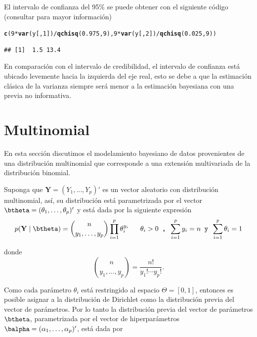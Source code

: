 \documentclass[10pt,openright]{book}\usepackage[]{graphicx}\usepackage[]{color}
\makeatletter
\newcommand{\hlnum}[1]{\textcolor[rgb]{0.686,0.059,0.569}{#1}}%
\newcommand{\hlopt}[1]{\textcolor[rgb]{0,0,0}{#1}}%
\newcommand{\hlstd}[1]{\textcolor[rgb]{0.345,0.345,0.345}{#1}}%
\newcommand{\hlkwd}[1]{\textcolor[rgb]{0.737,0.353,0.396}{\textbf{#1}}}%
\newenvironment{kframe}{%
 \def\at@end@of@kframe{}%
 \ifinner\ifhmode%
  \def\at@end@of@kframe{\end{minipage}}%
  \begin{minipage}{\columnwidth}%
 \fi\fi%
 \def\FrameCommand##1{\hskip\@totalleftmargin \hskip-\fboxsep
 \colorbox{shadecolor}{##1}\hskip-\fboxsep
     \hskip-\linewidth \hskip-\@totalleftmargin \hskip\columnwidth}%
 \MakeFramed {\advance\hsize-\width
   \@totalleftmargin\z@ \linewidth\hsize
   \@setminipage}}%
 {\par\unskip\endMakeFramed%
 \at@end@of@kframe}
\newenvironment{knitrout}{}{} %
\makeatother
\begin{document}
\begin{Eje}
El intervalo de confianza del 95\% se puede obtener con el siguiente c\'odigo (consultar  para mayor informaci\'on)
\begin{knitrout}
\color{fgcolor}\begin{kframe}
\begin{alltt}
\hlkwd{c}\hlstd{(}\hlnum{9} \hlopt{*} \hlkwd{var}\hlstd{(y[,}\hlnum{1}\hlstd{])} \hlopt{/} \hlkwd{qchisq}\hlstd{(}\hlnum{0.975}\hlstd{,}\hlnum{9}\hlstd{),} \hlnum{9} \hlopt{*} \hlkwd{var}\hlstd{(y[,}\hlnum{2}\hlstd{])} \hlopt{/} \hlkwd{qchisq}\hlstd{(}\hlnum{0.025}\hlstd{,}\hlnum{9}\hlstd{))}
\end{alltt}
\begin{verbatim}
## [1]  1.5 13.4
\end{verbatim}
\end{kframe}
\end{knitrout}
En comparaci\'on con el intervalo de credibilidad, el intervalo de confianza est\'a ubicado levemente hacia la izquierda del eje real, esto se debe a que la estimaci\'on cl\'asica de la varianza siempre ser\'a menor a la estimaci\'on bayesiana con una previa no informativa.
\end{Eje}
  
\section{Multinomial}
En esta secci\'on discutimos el modelamiento bayesiano de datos provenientes de una distribuci\'on multinomial que corresponde a una extensi\'on multivariada de la distribuci\'on binomial. 

Suponga que $\textbf{Y}=(Y_1,\ldots,Y_p)'$ es un vector aleatorio con distribuci\'on multinomial, as\'i, su distribuci\'on est\'a parametrizada por el vector $\btheta=(\theta_1,\ldots,\theta_p)'$ y est\'a dada por la siguiente expresi\'on
  \begin{equation}
  p(\mathbf{Y} \mid \btheta)=\binom{n}{y_1,\ldots,y_p}\prod_{i=1}^p\theta_i^{y_i} \ \ \ \ \ \theta_i>0 \texttt{ , }  \sum_{i=1}^py_i=n \texttt{ y } \sum_{i=1}^p\theta_i=1
  \end{equation}
  
  donde
  \begin{equation*}
  \binom{n}{y_1,\ldots,y_p}=\frac{n!}{y_1!\cdots y_p!}.
  \end{equation*}
  
  Como cada par\'ametro $\theta_i$ est\'a restringido al espacio $\Theta=[0,1]$, entonces es posible asignar a la distribuci\'on de Dirichlet como la distribuci\'on previa del vector de par\'ametros. Por lo tanto la distribuci\'on previa del vector de par\'ametros $\btheta$, parametrizada por el vector de hiperpar\'ametros $\balpha=(\alpha_1,\ldots,\alpha_p)'$, est\'a dada por
  
\end{document}

